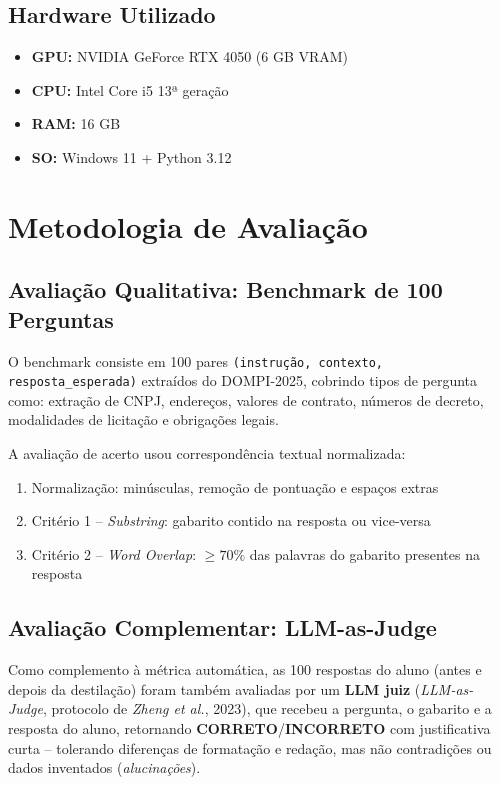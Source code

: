 \documentclass[12pt, a4paper]{article}
\begin{document}
\subsection{Hardware Utilizado}

\begin{itemize}
  \item \textbf{GPU:} NVIDIA GeForce RTX 4050 (6 GB VRAM)
  \item \textbf{CPU:} Intel Core i5 13ª geração
  \item \textbf{RAM:} 16 GB
  \item \textbf{SO:} Windows 11 + Python 3.12
\end{itemize}

\section{Metodologia de Avaliação}

\subsection{Avaliação Qualitativa: Benchmark de 100 Perguntas}

O benchmark consiste em 100 pares \texttt{(instrução, contexto, resposta\_esperada)}
extraídos do DOMPI-2025, cobrindo tipos de pergunta como:
extração de CNPJ, endereços, valores de contrato, números de decreto, modalidades de
licitação e obrigações legais.

A avaliação de acerto usou correspondência textual normalizada:
\begin{enumerate}
  \item Normalização: minúsculas, remoção de pontuação e espaços extras
  \item Critério 1 -- \textit{Substring}: gabarito contido na resposta ou vice-versa
  \item Critério 2 -- \textit{Word Overlap}: $\geq 70\%$ das palavras do gabarito
        presentes na resposta
\end{enumerate}

\subsection{Avaliação Complementar: LLM-as-Judge}

Como complemento à métrica automática, as 100 respostas do aluno (antes e depois da
destilação) foram também avaliadas por um \textbf{LLM juiz} (\textit{LLM-as-Judge},
protocolo de \textit{Zheng et al.}, 2023), que recebeu a pergunta, o gabarito e a
resposta do aluno, retornando \textbf{CORRETO}/\textbf{INCORRETO} com justificativa
curta -- tolerando diferenças de formatação e redação, mas não contradições ou dados
inventados (\textit{alucinações}).
\end{document}
